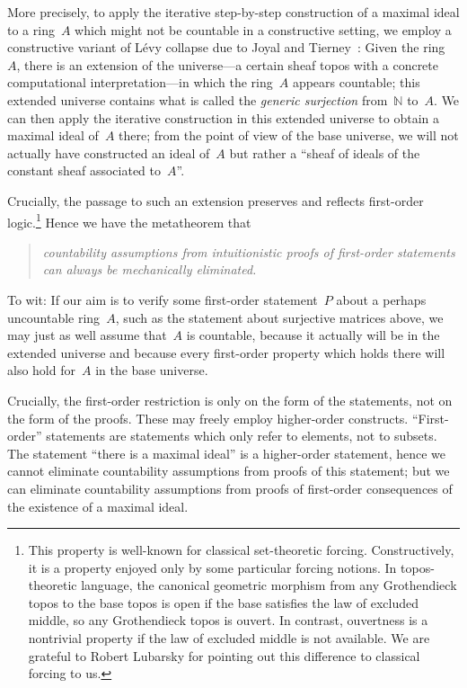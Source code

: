\documentclass[envcountsect,envcountsame,runningheads]{llncs}
\newcommand{\NN}{\mathbb{N}}
\renewcommand{\_}{\mathpunct{.}\,}
\begin{document}
More precisely, to apply the iterative step-by-step construction of a maximal ideal to a
ring~$A$ which might not be countable in a constructive setting, we employ a
constructive variant of Lévy collapse due to Joyal and
Tierney~\cite[pp.~36f.]{joyal-tierney:grothendieck}: Given the ring~$A$, there
is an extension of the universe---a certain sheaf topos with a concrete
computational interpretation---in which the ring~$A$ appears countable; this extended
universe contains what is called the \emph{generic surjection} from~$\NN$
to~$A$. We can then apply the iterative construction in this extended universe
to obtain a maximal ideal of~$A$ there; from the point of view of the base
universe, we will not actually have constructed an ideal of~$A$ but rather a
``sheaf of ideals of the constant sheaf associated to~$A$''.

Crucially, the passage to such an extension preserves and reflects
first-order logic.\footnote{This property is well-known for classical
set-theoretic forcing. Constructively, it is a property enjoyed only by some
particular forcing notions. In topos-theoretic language, the canonical
geometric morphism from any Grothendieck topos to the base topos is open
if the base satisfies the law of excluded middle, so any Grothendieck topos is
ouvert. In contrast, ouvertness is a nontrivial property if the law of excluded
middle is not available. We are grateful to Robert Lubarsky for pointing out
this difference to classical forcing to us.}
Hence we have the metatheorem that
\begin{quote}\emph{countability
assumptions from intuitionistic proofs of first-order statements can always be
mechanically eliminated.}\end{quote}
To wit: If our aim is to verify some first-order
statement~$P$ about a perhaps uncountable ring~$A$, such as the statement about
surjective matrices above, we may just as well assume that~$A$ is countable,
because it actually will be in the extended universe and because every
first-order property which holds there will also hold for~$A$ in the base
universe.

Crucially, the first-order restriction is only on the form
of the statements, not on the form of the proofs. These may freely employ higher-order constructs.
``First-order'' statements are statements which only refer to elements, not to
subsets. The statement ``there is a maximal ideal'' is a higher-order
statement, hence we cannot eliminate countability assumptions from proofs of
this statement; but we can eliminate countability assumptions from proofs of
first-order consequences of the existence of a maximal ideal.
\end{document}

